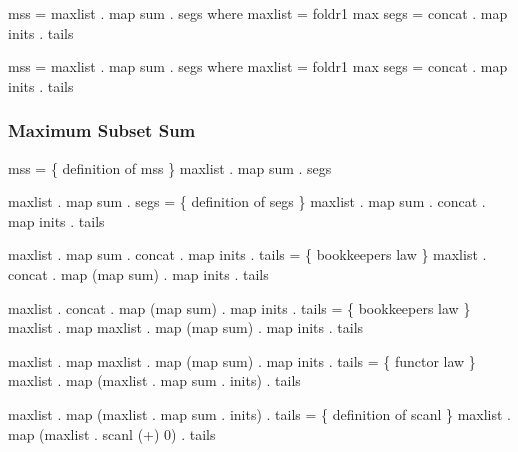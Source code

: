 \documentclass{beamer}
\newcommand{\cb}[1]{{\color{violet}#1}}
\begin{document}
\begin{frame}[fragile,t]
\begin{overprint}
\begin{semiverbatim}
mss = \cb{maxlist . map sum . segs}
  where
    maxlist = foldr1 max
    segs = concat . map inits . tails
\end{semiverbatim}

\begin{semiverbatim}
\cb{mss} = maxlist . map sum . segs
  where
    maxlist = foldr1 max
    segs = concat . map inits . tails
\end{semiverbatim}

\end{overprint}

\end{frame}

\begin{frame}[fragile,t]
    \frametitle{Maximum Subset Sum}

\begin{center}
\begin{overprint}

\begin{semiverbatim}
  \cb{mss}
=    \{ definition of mss \}
  \cb{maxlist . map sum . segs}
\end{semiverbatim}

\begin{semiverbatim}
  maxlist . map sum . \cb{segs}
=    \{ definition of segs \}
  maxlist . map sum . \cb{concat . map inits . tails}
\end{semiverbatim}

\begin{semiverbatim}
  maxlist . \cb{map sum . concat} . map inits . tails
=    \{ bookkeepers law \}
  maxlist . \cb{concat . map (map sum)} . map inits . tails
\end{semiverbatim}

\begin{semiverbatim}
  \cb{maxlist . concat} . map (map sum) . map inits . tails
=    \{ bookkeepers law \}
  \cb{maxlist . map maxlist} . map (map sum) . map inits . tails
\end{semiverbatim}

\begin{semiverbatim}
  maxlist . \cb{map maxlist . map (map sum) . map inits} . tails
=    \{ functor law \}
  maxlist . \cb{map (maxlist . map sum . inits)} . tails
\end{semiverbatim}

\begin{semiverbatim}
  maxlist . map (maxlist . \cb{map sum . inits}) . tails
=    \{ definition of scanl \}
  maxlist . map (maxlist . \cb{scanl (+) 0}) . tails
\end{semiverbatim}


\end{overprint}
\end{center}
\end{frame}
\end{document}
